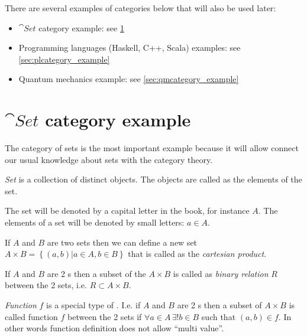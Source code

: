 There are several examples of categories below that will also be used
later:
\begin{itemize}
\item $\cat{Set}$ category example: see \cref{sec:setcategory_example}
\item Programming languages (Haskell, C++, Scala) examples: see
  \cref{sec:plcategory_example}
\item Quantum mechanics example: see \cref{sec:qmcategory_example}
\end{itemize}

\section{$\cat{Set}$ category example}
\label{sec:setcategory_example}
The category of sets is the most important example because it will
allow connect our usual knowledge about sets with the category theory. 

\begin{definition}[Set]
  \label{def:set}
  \textit{Set} is a collection of distinct objects. The objects are called as
  the elements of the set. 

  The set will be denoted by a capital letter in
  the book, for instance $A$. The elements of a set will be denoted by
  small letters: $a \in A$.
\end{definition}

\begin{definition}
  \label{def:cartesian_product}
  If $A$ and $B$ are two sets then we can define a new set $A \times B
  = \left\{(a,b)|a \in A, b \in B\right\}$ that is called as the
  \textit{cartesian product}.
\end{definition}

\begin{definition}
  \label{def:binary_relation}
  If $A$ and $B$ are 2 s then a subset of the
   $A \times B$ is
  called as \textit{binary relation} $R$ between the 2 sets, i.e. $R
  \subset A \times B$. 
\end{definition}

\begin{definition}[Function]
  \label{def:function}
  \textit{Function} $f$ is a special type of . I.e.
  if $A$ and $B$ are 2 s then a subset of $A \times B$ is
  called function $f$ between the 2 sets if $\forall a \in A \, \exists!
  b \in B$ such that $(a,b) \in f$. In other words function definition
  does not allow ``multi value''.
\end{definition}

